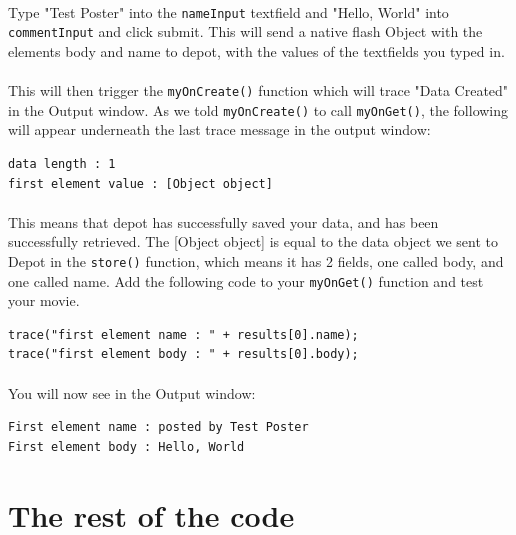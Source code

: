\documentclass[12pt]{report}
\begin{document}
\paragraph{}
Type "Test Poster" into the \texttt{nameInput} textfield and "Hello,
World" into \texttt{commentInput} and click submit. This will send a
native flash Object with the elements body and name to depot, with the
values of the textfields you typed in.

\paragraph{}
This will then trigger the \texttt{myOnCreate()} function which will
trace "Data Created" in the Output window. As we told
\texttt{myOnCreate()} to call \texttt{myOnGet()}, the following will
appear underneath the last trace message in the output window:

\begin{Verbatim}[frame=single]
data length : 1
first element value : [Object object]
\end{Verbatim}

\paragraph{}
This means that depot has successfully saved your data, and has been
successfully retrieved.  The [Object object] is equal to the data
object we sent to Depot in the \texttt{store()} function, which means
it has 2 fields, one called body, and one called name. Add the
following code to your \texttt{myOnGet()} function and test your
movie.

\begin{Verbatim}[frame=single]
trace("first element name : " + results[0].name);
trace("first element body : " + results[0].body);
\end{Verbatim}

\paragraph{}
You will now see in the Output window:

\begin{Verbatim}[frame=single]
First element name : posted by Test Poster
First element body : Hello, World
\end{Verbatim}


\section{The rest of the code}
\end{document}
